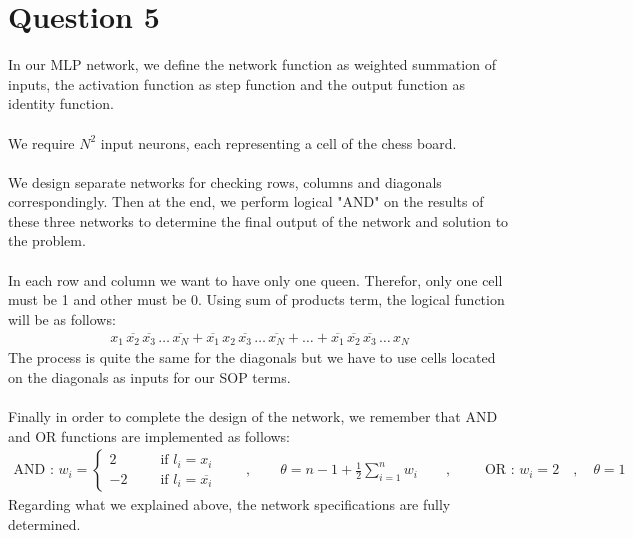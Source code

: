 \documentclass[]{article}
\begin{document}
	\section{Question 5}
	In our MLP network, we define the network function as weighted summation of inputs, the activation function as step function and the output function as identity function.\\\\
	We require $N^2$ input neurons, each representing a cell of the chess board.\\\\
	We design separate networks for checking rows, columns and diagonals correspondingly. Then at the end, we perform logical "AND" on the results of these three networks to determine the final output of the network and solution to the problem.\\\\
	In each row and column we want to have only one queen. Therefor, only one cell must be 1 and other must be 0. Using sum of products term, the logical function will be as follows:
	\begin{align*}
		x_1 \, \overline{x_2} \, \overline{x_3} \, \dots \, \overline{x_N} + \overline{x_1} \, x_2 \, \overline{x_3} \, \dots \, \overline{x_N} + \dots + \overline{x_1} \, \overline{x_2} \, \overline{x_3} \, \dots \, x_N
	\end{align*} 
	The process is quite the same for the diagonals but we have to use cells located on the diagonals as inputs for our SOP terms.\\\\
	Finally in order to complete the design of the network, we remember that AND and OR functions are implemented as follows:
	\begin{align*}
		\text{AND : } w_i = \begin{cases}
			2 \qquad & \text{ if } l_i = x_i \\
			-2 & \text{ if } l_i = \overline{x_i}
		\end{cases} \qquad , \qquad \theta = n - 1 + \frac{1}{2} \sum_{i=1}^{n} w_i \qquad , \qquad \text{ OR : } w_i = 2 \quad , \quad \theta = 1
	\end{align*}
	Regarding what we explained above, the network specifications are fully determined.
	
\end{document}
